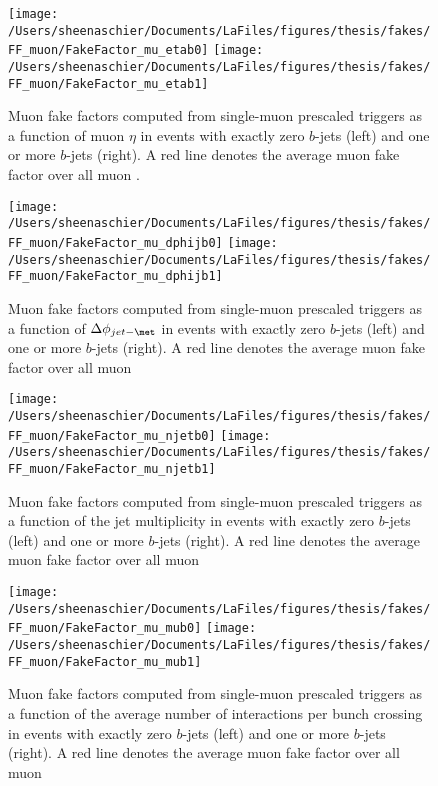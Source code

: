 \documentclass[11pt, oneside]{article}   	%
\begin{document}
\begin{figure}[tbp]
  \centering
  \texttt{[image: /Users/sheenaschier/Documents/LaFiles/figures/thesis/fakes/FF\_muon/FakeFactor\_mu\_etab0]}
  \texttt{[image: /Users/sheenaschier/Documents/LaFiles/figures/thesis/fakes/FF\_muon/FakeFactor\_mu\_etab1]}\\
  \caption{Muon fake factors computed from single-muon prescaled triggers as a function of muon $\eta$ in events with exactly zero $b$-jets (left) and one or more $b$-jets (right). A red line denotes the average muon fake factor over all muon \pt{}.}
  \label{fig:muon_FF_hist_eta}
\end{figure}

\begin{figure}[tbp]
  \centering
  \texttt{[image: /Users/sheenaschier/Documents/LaFiles/figures/thesis/fakes/FF\_muon/FakeFactor\_mu\_dphijb0]}
  \texttt{[image: /Users/sheenaschier/Documents/LaFiles/figures/thesis/fakes/FF\_muon/FakeFactor\_mu\_dphijb1]}
  \caption{Muon fake factors computed from single-muon prescaled triggers as a function of $\Delta\phi_{jet-\met}$ in events with exactly zero $b$-jets (left) and one or more $b$-jets (right).  A red line denotes the average muon fake factor over all muon \pt{}}
  \label{fig:muon_FF_dphij1}
\end{figure}

\begin{figure}[tbp]
  \centering
  \texttt{[image: /Users/sheenaschier/Documents/LaFiles/figures/thesis/fakes/FF\_muon/FakeFactor\_mu\_njetb0]}
  \texttt{[image: /Users/sheenaschier/Documents/LaFiles/figures/thesis/fakes/FF\_muon/FakeFactor\_mu\_njetb1]}\\
  \caption{Muon fake factors computed from single-muon prescaled triggers as a function of the jet multiplicity in events with exactly zero $b$-jets (left) and one or more $b$-jets (right).  A red line denotes the average muon fake factor over all muon \pt{}}
  \label{fig:muon_FF_njet}
\end{figure}

\begin{figure}[tbp]
  \centering
  \texttt{[image: /Users/sheenaschier/Documents/LaFiles/figures/thesis/fakes/FF\_muon/FakeFactor\_mu\_mub0]}
  \texttt{[image: /Users/sheenaschier/Documents/LaFiles/figures/thesis/fakes/FF\_muon/FakeFactor\_mu\_mub1]}\\
  \caption{Muon fake factors computed from single-muon prescaled triggers as a function of the average number of interactions per bunch crossing in events with exactly zero $b$-jets (left) and one or more $b$-jets (right).  A red line denotes the average muon fake factor over all muon \pt{}}
  \label{fig:muon_FF_mu}
\end{figure}
\end{document}
